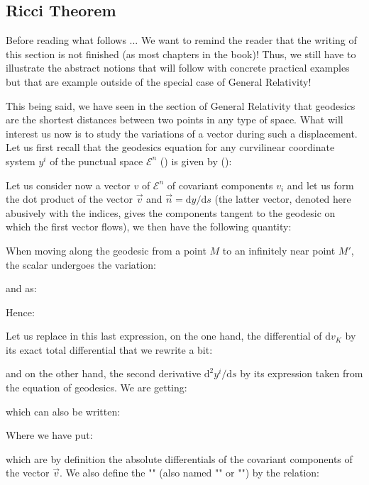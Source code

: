 	\subsection{Ricci Theorem}
	\begin{tcolorbox}[colback=red!5,borderline={1mm}{2mm}{red!5},arc=0mm,boxrule=0pt]
	\bcbombe Before reading what follows ... We want to remind the reader that the writing of this section is not finished (as most chapters in the book)! Thus, we still have to illustrate the abstract notions that will follow with concrete practical examples but that are example outside of the special case of General Relativity!
	\end{tcolorbox}
	This being said, we have seen in the section of General Relativity that geodesics are the shortest distances between two points in any type of space. What will interest us now is to study the variations of a vector during such a displacement. Let us first recall that the geodesics equation for any curvilinear coordinate system $y^i$ of the punctual space $\mathcal{E}^n$ () is given by ():
	
	Let us consider now a vector $v$ of $\mathcal{E}^n$ of covariant components $v_i$ and let us form the dot product of the vector $\vec{v}$ and $\vec{n}=\mathrm{d}y/\mathrm{d}s$ (the latter vector, denoted here abusively with the indices, gives the components tangent to the geodesic on which the first vector flows), we then have the following quantity:
	
	When moving along the geodesic from a point $M$ to an infinitely near point $M'$, the scalar undergoes the variation:
	
	and as:
	
	Hence:
	
	Let us replace in this last expression, on the one hand, the differential of $\mathrm{d}v_K$ by its exact total differential that we rewrite a bit:
	
	and on the other hand, the second derivative $\mathrm{d}^2y^i/\mathrm{d}s$ by its expression taken from the equation of geodesics. We are getting:
	
	which can also be written:
	
	Where we have put:
	
	which are by definition the absolute differentials of the covariant components of the vector $\vec{v}$. We also define the "\label{covariant derivative}" (also named "" or "") by the relation:
	
